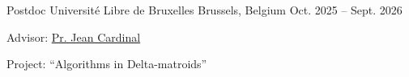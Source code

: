 \vspace*{7.1pt} %
\begin{cventries}
	
	\cventry
	{Postdoc} %
	{Université Libre de Bruxelles} %
	{Brussels, Belgium} %
	{Oct. 2025 -- Sept. 2026} %
	{\begin{cvitems}
			\item Advisor: \href{https://jean.cardinal.web.ulb.be/}{Pr. Jean Cardinal}
			\item Project: ``Algorithms in Delta-matroids''
		\end{cvitems}}
\end{cventries}
\vspace{12.8pt} %

